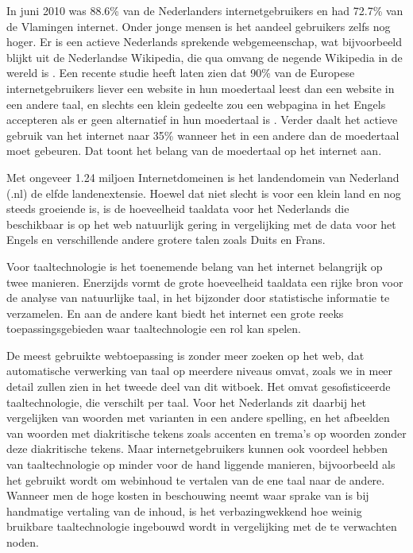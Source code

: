 \begin{multicols}{2}
    In juni 2010 was 88.6\% van de Nederlanders  internetgebruikers \cite{Internetworldstats} en had 72.7\% van de Vlamingen \cite{VRIND} internet. Onder jonge mensen is het aandeel gebruikers zelfs nog hoger. Er is een actieve Nederlands sprekende webgemeenschap, wat bijvoorbeeld blijkt uit de Nederlandse Wikipedia, die qua omvang de negende Wikipedia in de wereld is \cite{Wikipedia}.  Een recente studie heeft laten zien dat 90\% van de Europese internetgebruikers liever een website in hun moedertaal leest dan een website in een andere taal, en slechts een klein gedeelte zou een webpagina in het Engels accepteren als er geen alternatief in hun moedertaal is \cite{EC1}. Verder daalt het actieve gebruik van het internet naar 35\% wanneer het in een andere dan de moedertaal moet gebeuren. Dat toont het belang van de moedertaal op het internet aan.


    Met ongeveer 1.24 miljoen Internetdomeinen \cite{Webstats} is het landendomein van Nederland (.nl) de elfde landenextensie. Hoewel dat niet slecht is voor een klein land en nog steeds groeiende is, is de hoeveelheid taaldata voor het Nederlands die beschikbaar is op het web natuurlijk gering in vergelijking met de data voor het Engels en verschillende andere grotere talen zoals Duits en Frans.

    Voor taaltechnologie is het toenemende belang van het internet belangrijk op twee manieren. Enerzijds vormt de grote hoeveelheid taaldata een rijke bron voor de analyse van natuurlijke taal, in het bijzonder door statistische informatie te verzamelen. En aan de andere kant biedt het internet een grote reeks toepassingsgebieden waar taaltechnologie een rol kan spelen.

    De meest gebruikte webtoepassing is zonder meer zoeken op het web, dat automatische verwerking van taal op meerdere niveaus omvat, zoals we in meer detail zullen zien in het tweede deel van dit witboek. Het omvat gesofisticeerde taaltechnologie, die verschilt per taal. Voor het Nederlands zit daarbij het vergelijken van woorden met varianten in een andere spelling, en het afbeelden van woorden met diakritische tekens zoals accenten en trema's op woorden zonder deze diakritische tekens. Maar internetgebruikers kunnen ook voordeel hebben van taaltechnologie op minder voor de hand liggende manieren, bijvoorbeeld als het gebruikt wordt om web\-inhoud te vertalen van de ene taal naar de andere. Wanneer men de hoge kosten in beschouwing neemt waar sprake van is bij handmatige vertaling van de inhoud, is het verbazingwekkend hoe weinig bruikbare taaltechnologie ingebouwd wordt in vergelijking met de te verwachten noden.


\end{multicols}
